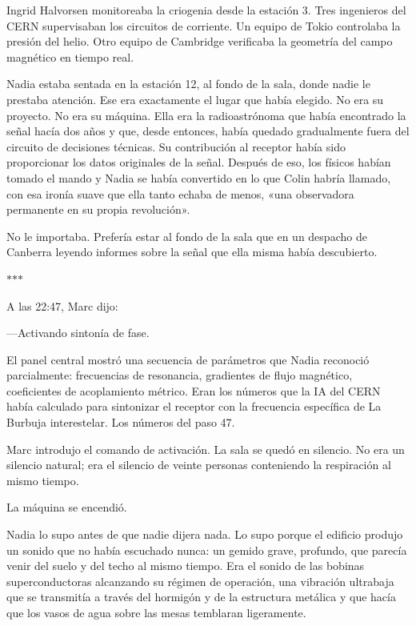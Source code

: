 \documentclass[11pt,a5paper,twoside]{book}
\begin{document}
Ingrid Halvorsen monitoreaba la criogenia desde la estación 3. Tres ingenieros del CERN supervisaban los circuitos de corriente. Un equipo de Tokio controlaba la presión del helio. Otro equipo de Cambridge verificaba la geometría del campo magnético en tiempo real.

Nadia estaba sentada en la estación 12, al fondo de la sala, donde nadie le prestaba atención. Ese era exactamente el lugar que había elegido. No era su proyecto. No era su máquina. Ella era la radioastrónoma que había encontrado la señal hacía dos años y que, desde entonces, había quedado gradualmente fuera del circuito de decisiones técnicas. Su contribución al receptor había sido proporcionar los datos originales de la señal. Después de eso, los físicos habían tomado el mando y Nadia se había convertido en lo que Colin habría llamado, con esa ironía suave que ella tanto echaba de menos, «una observadora permanente en su propia revolución».

No le importaba. Prefería estar al fondo de la sala que en un despacho de Canberra leyendo informes sobre la señal que ella misma había descubierto.

\vspace{1.5em}
\begin{center}$\ast$\quad$\ast$\quad$\ast$\end{center}
\vspace{1.5em}

A las 22:47, Marc dijo:

—Activando sintonía de fase.

El panel central mostró una secuencia de parámetros que Nadia reconoció parcialmente: frecuencias de resonancia, gradientes de flujo magnético, coeficientes de acoplamiento métrico. Eran los números que la IA del CERN había calculado para sintonizar el receptor con la frecuencia específica de La Burbuja interestelar. Los números del paso 47.

Marc introdujo el comando de activación. La sala se quedó en silencio. No era un silencio natural; era el silencio de veinte personas conteniendo la respiración al mismo tiempo.

La máquina se encendió.

Nadia lo supo antes de que nadie dijera nada. Lo supo porque el edificio produjo un sonido que no había escuchado nunca: un gemido grave, profundo, que parecía venir del suelo y del techo al mismo tiempo. Era el sonido de las bobinas superconductoras alcanzando su régimen de operación, una vibración ultrabaja que se transmitía a través del hormigón y de la estructura metálica y que hacía que los vasos de agua sobre las mesas temblaran ligeramente.
\end{document}
